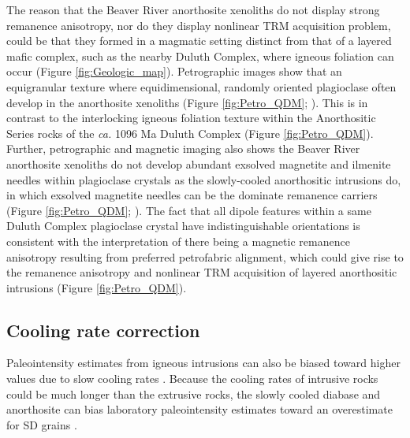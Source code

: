 \documentclass[9pt,twocolumn,twoside,lineno]{pnas-new}
\begin{document}
The reason that the Beaver River anorthosite xenoliths do not display strong remanence anisotropy, nor do they display nonlinear TRM acquisition problem, could be that they formed in a magmatic setting distinct from that of a layered mafic complex, such as the nearby Duluth Complex, where igneous foliation can occur (Figure \ref{fig:Geologic_map}). Petrographic images show that an equigranular texture where equidimensional, randomly oriented plagioclase often develop in the anorthosite xenoliths (Figure \ref{fig:Petro_QDM}; ). This is in contrast to the interlocking igneous foliation texture within the Anorthositic Series rocks of the \textit{ca.} 1096 Ma Duluth Complex (Figure \ref{fig:Petro_QDM}). Further, petrographic and magnetic imaging also shows the Beaver River anorthosite xenoliths do not develop abundant exsolved magnetite and ilmenite needles within plagioclase crystals as the slowly-cooled anorthositic intrusions do, in which exsolved magnetite needles can be the dominate remanence carriers (Figure \ref{fig:Petro_QDM}; ). The fact that all dipole features within a same Duluth Complex plagioclase crystal have indistinguishable orientations is consistent with the interpretation of there being a magnetic remanence anisotropy resulting from preferred petrofabric alignment, which could give rise to the remanence anisotropy and nonlinear TRM acquisition of layered anorthositic intrusions (Figure \ref{fig:Petro_QDM}). 

\subsection*{Cooling rate correction}
Paleointensity estimates from igneous intrusions can also be biased toward higher values due to slow cooling rates \cite{Halgedahl1980a}. Because the cooling rates of intrusive rocks could be much longer than the extrusive rocks, the slowly cooled diabase and anorthosite can bias laboratory paleointensity estimates toward an overestimate for SD grains \cite{Dodson1980a, Halgedahl1980a, Selkin2000a}. 
\end{document}
